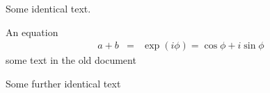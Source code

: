 \documentclass{article}
\begin{document}
Some identical text.

An equation
\begin{eqnarray}
a + b & = & \exp(i\phi)=\cos \phi + i \sin \phi
\end{eqnarray}
some text in the old document

Some further identical text
\end{document}
